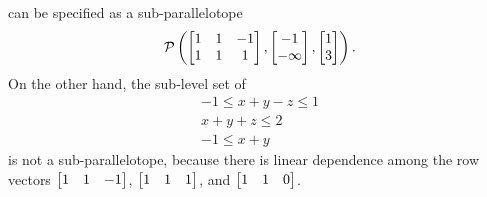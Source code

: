 %
can be specified as a sub-parallelotope
%
\[
\mathcal{P}\left(\left[\begin{matrix}
    1 & 1 & -1\\
    1 & 1 & 1
  \end{matrix}
  \right],\left[
    \begin{matrix}
      -1\\
      -\infty
    \end{matrix}
    \right]
,\left[
    \begin{matrix}
      1\\
      3
    \end{matrix}
    \right]
\right).
\]
  On the other hand, the
sub-level set of
%
\begin{align*}
  -1\leq x+y-z\leq 1\\
  x+y+z\leq 2\\
  -1\leq x+y
\end{align*}
%
is not a sub-parallelotope, because there is linear dependence among
the row vectors $\left[\begin{matrix} 1 & 1 & -1\end{matrix}\right]$,
$\left[\begin{matrix} 1 & 1 & 1\end{matrix}\right]$, and
$\left[\begin{matrix} 1 & 1 & 0 \end{matrix}\right]$.

